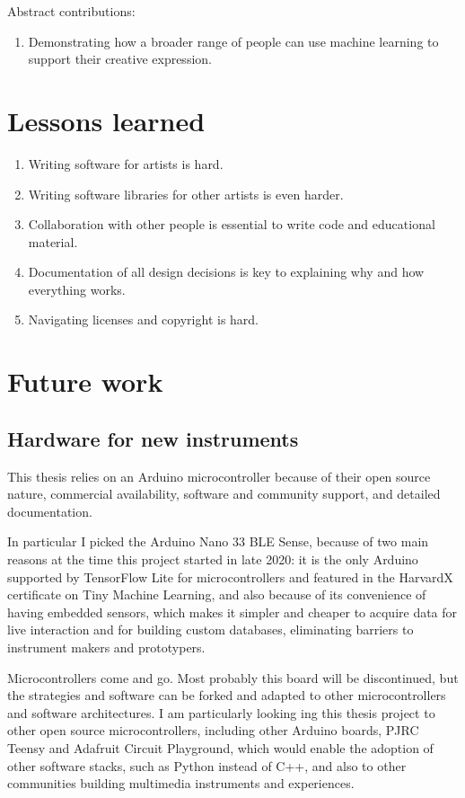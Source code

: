 Abstract contributions:

\begin{enumerate}
 \item Demonstrating how a broader range of people can use machine learning to support their creative expression.
\end{enumerate}

\section{Lessons learned}

\begin{enumerate}
  \item Writing software for artists is hard.
  \item Writing software libraries for other artists is even harder.
  \item Collaboration with other people is essential to write code and educational material.
  \item Documentation of all design decisions is key to explaining why and how everything works.
  \item Navigating licenses and copyright is hard.
\end{enumerate}

\section{Future work}

\subsection{Hardware for new instruments}

This thesis relies on an Arduino microcontroller because of their open source nature, commercial availability, software and community support, and detailed documentation.

In particular I picked the Arduino Nano 33 \acrshort{BLE} Sense, because of two main reasons at the time this project started in late 2020: it is the only Arduino supported by TensorFlow Lite for microcontrollers and featured in the HarvardX certificate on Tiny Machine Learning, and also because of its convenience of having embedded sensors, which makes it simpler and cheaper to acquire data for live interaction and for building custom databases, eliminating barriers to instrument makers and prototypers.

Microcontrollers come and go. Most probably this board will be discontinued, but the strategies and software can be forked and adapted to other microcontrollers and software architectures. I am particularly looking ing this thesis project to other open source microcontrollers, including other Arduino boards, PJRC Teensy and Adafruit Circuit Playground, which would enable the adoption of other software stacks, such as Python instead of C++, and also to other communities building multimedia instruments and experiences.

